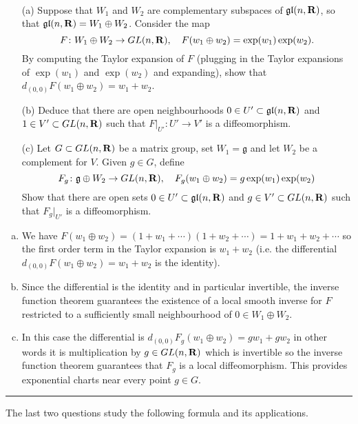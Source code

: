 \documentclass[12pt]{article}
\begin{document}
\begin{question}\ \\
\begin{enumerate}
\item[(a)] Suppose that $W_1$ and $W_2$ are complementary subspaces of $\mathfrak{gl}(n,\mathbf{R})$, so that $\mathfrak{gl}(n,\mathbf{R})=W_1\oplus W_2$. Consider the map
\[F\colon W_1\oplus W_2\to GL(n,\mathbf{R}),\quad F(w_1\oplus w_2)=\exp(w_1)\exp(w_2).\]
By computing the Taylor expansion of $F$ (plugging in the Taylor expansions of $\exp(w_1)$ and $\exp(w_2)$ and expanding), show that $d_{(0,0)}F(w_1\oplus w_2)=w_1+w_2$.
\item[(b)] Deduce that there are open neighbourhoods $0\in U'\subset\mathfrak{gl}(n,\mathbf{R})$ and $1\in V'\subset GL(n,\mathbf{R})$ such that $F|_{U'}\colon U'\to V'$ is a diffeomorphism.
\item[(c)] Let $G\subset GL(n,\mathbf{R})$ be a matrix group, set $W_1=\mathfrak{g}$ and let $W_2$ be a complement for $V$. Given $g\in G$, define
\[F_g\colon\mathfrak{g}\oplus W_2\to GL(n,\mathbf{R}),\quad F_g(w_1\oplus w_2)=g\exp(w_1)\exp(w_2)\]
Show that there are open sets $0\in U'\subset\mathfrak{gl}(n,\mathbf{R})$ and $g\in V'\subset GL(n,\mathbf{R})$ such that $F_g|_{U'}$ is a diffeomorphism.
\end{enumerate}
\end{question}

\begin{answer}
\begin{enumerate}[(a)]
\item We have $F(w_1\oplus w_2)=(1+w_1+\cdots)(1+w_2+\cdots)=1+w_1+w_2+\cdots$ so the first order term in the Taylor expansion is $w_1+w_2$ (i.e. the differential $d_{(0,0)}F(w_1\oplus w_2)=w_1+w_2$ is the identity).
\item Since the differential is the identity and in particular invertible, the inverse function theorem guarantees the existence of a local smooth inverse for $F$ restricted to a sufficiently small neighbourhood of $0\in W_1\oplus W_2$.
\item In this case the differential is $d_{(0,0)}F_g(w_1\oplus w_2)=gw_1+gw_2$ in other words it is multiplication by $g\in GL(n,\mathbf{R})$ which is invertible so the inverse function theorem guarantees that $F_g$ is a local diffeomorphism. This provides exponential charts near every point $g\in G$.
\end{enumerate}
\end{answer}
\newpage

\bigskip
\hrule
\bigskip
The last two questions study the following formula and its applications.
\end{document}
